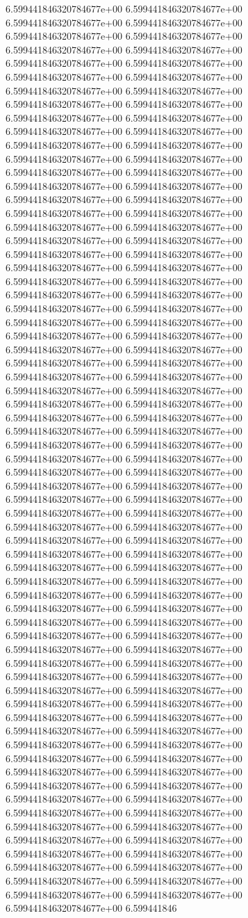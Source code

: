 6.599441846320784677e+00	6.599441846320784677e+00	6.599441846320784677e+00	6.599441846320784677e+00	6.599441846320784677e+00	6.599441846320784677e+00	6.599441846320784677e+00	6.599441846320784677e+00	6.599441846320784677e+00	6.599441846320784677e+00	6.599441846320784677e+00	6.599441846320784677e+00	6.599441846320784677e+00	6.599441846320784677e+00	6.599441846320784677e+00	6.599441846320784677e+00	6.599441846320784677e+00	6.599441846320784677e+00	6.599441846320784677e+00	6.599441846320784677e+00	6.599441846320784677e+00	6.599441846320784677e+00	6.599441846320784677e+00	6.599441846320784677e+00	6.599441846320784677e+00	6.599441846320784677e+00	6.599441846320784677e+00	6.599441846320784677e+00	6.599441846320784677e+00	6.599441846320784677e+00	6.599441846320784677e+00	6.599441846320784677e+00	6.599441846320784677e+00	6.599441846320784677e+00	6.599441846320784677e+00	6.599441846320784677e+00	6.599441846320784677e+00	6.599441846320784677e+00	6.599441846320784677e+00	6.599441846320784677e+00	6.599441846320784677e+00	6.599441846320784677e+00	6.599441846320784677e+00	6.599441846320784677e+00	6.599441846320784677e+00	6.599441846320784677e+00	6.599441846320784677e+00	6.599441846320784677e+00	6.599441846320784677e+00	6.599441846320784677e+00	6.599441846320784677e+00	6.599441846320784677e+00	6.599441846320784677e+00	6.599441846320784677e+00	6.599441846320784677e+00	6.599441846320784677e+00	6.599441846320784677e+00	6.599441846320784677e+00	6.599441846320784677e+00	6.599441846320784677e+00	6.599441846320784677e+00	6.599441846320784677e+00	6.599441846320784677e+00	6.599441846320784677e+00	6.599441846320784677e+00	6.599441846320784677e+00	6.599441846320784677e+00	6.599441846320784677e+00	6.599441846320784677e+00	6.599441846320784677e+00	6.599441846320784677e+00	6.599441846320784677e+00	6.599441846320784677e+00	6.599441846320784677e+00	6.599441846320784677e+00	6.599441846320784677e+00	6.599441846320784677e+00	6.599441846320784677e+00	6.599441846320784677e+00	6.599441846320784677e+00	6.599441846320784677e+00	6.599441846320784677e+00	6.599441846320784677e+00	6.599441846320784677e+00	6.599441846320784677e+00	6.599441846320784677e+00	6.599441846320784677e+00	6.599441846320784677e+00	6.599441846320784677e+00	6.599441846320784677e+00	6.599441846320784677e+00	6.599441846320784677e+00	6.599441846320784677e+00	6.599441846320784677e+00	6.599441846320784677e+00	6.599441846320784677e+00	6.599441846320784677e+00	6.599441846320784677e+00	6.599441846320784677e+00	6.599441846320784677e+00	6.599441846320784677e+00	6.599441846320784677e+00	6.599441846320784677e+00	6.599441846320784677e+00	6.599441846320784677e+00	6.599441846320784677e+00	6.599441846320784677e+00	6.599441846320784677e+00	6.599441846320784677e+00	6.599441846320784677e+00	6.599441846320784677e+00	6.599441846320784677e+00	6.599441846320784677e+00	6.599441846320784677e+00	6.599441846320784677e+00	6.599441846320784677e+00	6.599441846320784677e+00	6.599441846320784677e+00	6.599441846320784677e+00	6.599441846320784677e+00	6.599441846320784677e+00	6.599441846320784677e+00	6.599441846320784677e+00	6.599441846320784677e+00	6.599441846320784677e+00	6.599441846320784677e+00	6.599441846320784677e+00	6.599441846320784677e+00	6.599441846320784677e+00	6.599441846320784677e+00	6.599441846320784677e+00	6.599441846320784677e+00	6.599441846320784677e+00	6.599441846